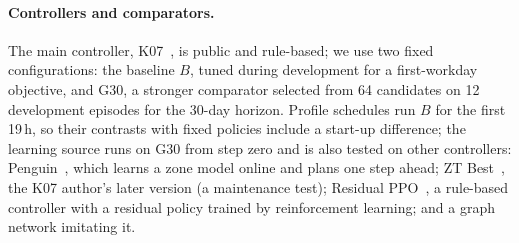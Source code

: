 \documentclass{article}
\begin{document}
\paragraph{Controllers and comparators.}
The main controller, K07~\cite{malyshev2026k07}, is public and rule-based; we use two fixed configurations: the baseline
$B$, tuned during development for a first-workday objective, and G30, a stronger comparator selected from 64 candidates on
12 development episodes for the 30-day horizon. Profile schedules run $B$ for the first 19\,h, so their contrasts with fixed policies
include a start-up difference; the learning source runs on G30 from step zero and is also tested on other
controllers: Penguin~\cite{penguin2026deep}, which learns a zone model online and plans one step ahead; ZT
Best~\cite{malyshev2026zt}, the K07 author's later version (a maintenance test); Residual PPO~\cite{chilton2026resppo}, a rule-based
controller with a residual policy trained by reinforcement learning; and a graph network imitating it.
\end{document}
